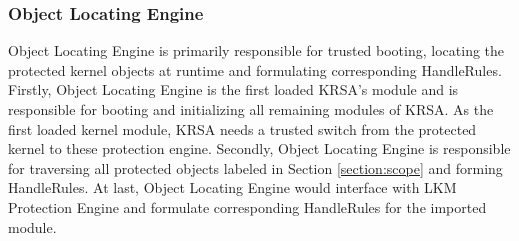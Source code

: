 \documentclass[conference]{IEEEtran}
\begin{document}
\subsubsection{Object Locating Engine}
Object Locating Engine is primarily responsible for trusted booting, locating the protected kernel objects at runtime and formulating corresponding HandleRules. 
Firstly, Object Locating Engine is the first loaded KRSA's module and is responsible for booting and initializing all remaining modules of KRSA. As the first loaded kernel module, KRSA needs a trusted switch from the protected kernel to these protection engine. Secondly, Object Locating Engine is responsible for traversing all protected objects labeled in Section \ref{section:scope} and forming HandleRules.
At last, Object Locating Engine would interface with LKM Protection Engine and formulate corresponding HandleRules for the imported module. 
\end{document}

